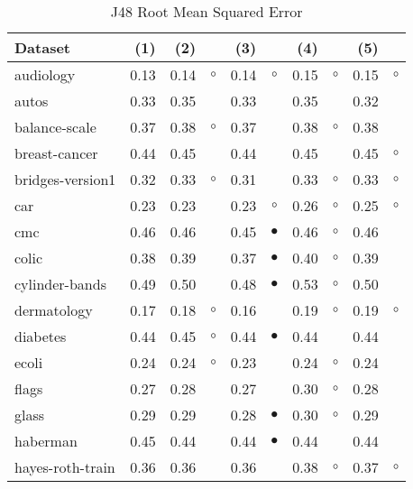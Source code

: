 \begin{table}[thb]
\caption{\label{j48rmse}J48 Root Mean Squared Error}
\footnotesize
{\centering \begin{tabular}{lrr@{\hspace{0.1cm}}cr@{\hspace{0.1cm}}cr@{\hspace{0.1cm}}cr@{\hspace{0.1cm}}c}
\\
\hline
Dataset & (1)& (2) & & (3) & & (4) & & (5) & \\
\hline
audiology & 0.13 & 0.14 &   $\circ$ & 0.14 &   $\circ$ & 0.15 &   $\circ$ & 0.15 &   $\circ$\\
autos & 0.33 & 0.35 &           & 0.33 &           & 0.35 &           & 0.32 &          \\
balance-scale & 0.37 & 0.38 &   $\circ$ & 0.37 &           & 0.38 &   $\circ$ & 0.38 &          \\
breast-cancer & 0.44 & 0.45 &           & 0.44 &           & 0.45 &           & 0.45 &   $\circ$\\
bridges-version1 & 0.32 & 0.33 &   $\circ$ & 0.31 &           & 0.33 &   $\circ$ & 0.33 &   $\circ$\\
car & 0.23 & 0.23 &           & 0.23 &   $\circ$ & 0.26 &   $\circ$ & 0.25 &   $\circ$\\
cmc & 0.46 & 0.46 &           & 0.45 & $\bullet$ & 0.46 &   $\circ$ & 0.46 &          \\
colic & 0.38 & 0.39 &           & 0.37 & $\bullet$ & 0.40 &   $\circ$ & 0.39 &          \\
cylinder-bands & 0.49 & 0.50 &           & 0.48 & $\bullet$ & 0.53 &   $\circ$ & 0.50 &          \\
dermatology & 0.17 & 0.18 &   $\circ$ & 0.16 &           & 0.19 &   $\circ$ & 0.19 &   $\circ$\\
diabetes & 0.44 & 0.45 &   $\circ$ & 0.44 & $\bullet$ & 0.44 &           & 0.44 &          \\
ecoli & 0.24 & 0.24 &   $\circ$ & 0.23 &           & 0.24 &   $\circ$ & 0.24 &          \\
flags & 0.27 & 0.28 &           & 0.27 &           & 0.30 &   $\circ$ & 0.28 &          \\
glass & 0.29 & 0.29 &           & 0.28 & $\bullet$ & 0.30 &   $\circ$ & 0.29 &          \\
haberman & 0.45 & 0.44 &           & 0.44 & $\bullet$ & 0.44 &           & 0.44 &          \\
hayes-roth-train & 0.36 & 0.36 &           & 0.36 &           & 0.38 &   $\circ$ & 0.37 &   $\circ$\\

\end{tabular}}
\end{table}
